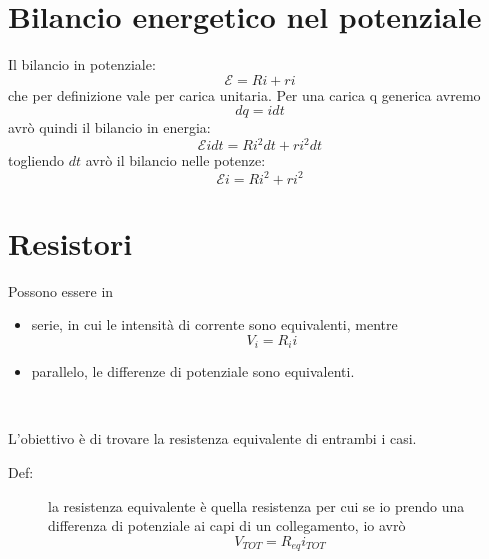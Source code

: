 \documentclass[a4paper, 12pt]{book}
\theoremstyle{plain}
\begin{document}
\section{Bilancio energetico nel potenziale}

Il bilancio in potenziale:
\[ \mathcal{E} = Ri + ri \] che per definizione vale 
per carica unitaria. Per una carica q generica avremo 
\[ dq = idt \] avrò quindi il bilancio in energia:
\[ \mathcal{E}idt = Ri^2dt + ri^2dt \] togliendo $dt$ 
avrò il bilancio nelle potenze:
\[ \mathcal{E}i = Ri^2 + ri^2 \] 

\section{Resistori}

Possono essere in
\begin{itemize}
    \item serie, in cui le intensità di corrente sono equivalenti, mentre \[ V_i = R_i i \] 
    \item parallelo, le differenze di potenziale sono equivalenti.
\end{itemize}
\begin{figure}[h!]
    \centering
    \quad
    \\
\end{figure}
L'obiettivo è di trovare la resistenza equivalente di entrambi 
i casi.
\begin{description}
    \item[Def:] la resistenza equivalente è quella resistenza per cui se io prendo una differenza di potenziale ai capi di un collegamento, io avrò \[ V_{TOT} = R_{eq}i_{TOT} \] 
\end{description}
\end{document}
